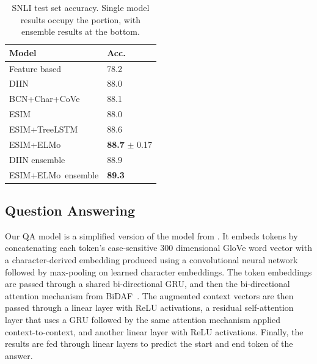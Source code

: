 \documentclass[11pt,a4paper]{article}
\newcommand{\ELMO}{ELMo}
\begin{document}
\begin{table}
\centering
\begin{tabular}{l|l}
\textbf{Model}                                                 & \textbf{Acc.} \\ \hline \hline
Feature based \citep{snliemnlp2015}                & 78.2                                                    \\
DIIN \citep{Gong2017NaturalLI}                      & 88.0                                                    \\
BCN+Char+CoVe \citep{McCann2017LearnedIT}       & 88.1                                                    \\
ESIM \citep{Chen2017EnhancedLF}                     & 88.0                                                    \\
ESIM+TreeLSTM \citep{Chen2017EnhancedLF} & 88.6                                                    \\
ESIM+\ELMO                                          & \textbf{88.7} $\pm$ 0.17                                           \\ \hline

DIIN ensemble \citep{Gong2017NaturalLI}             & 88.9                                                    \\
ESIM+\ELMO~ensemble                                 & \textbf{89.3}                                          
\end{tabular}
\caption{SNLI test set accuracy.\protect\footnotemark
Single model results occupy the portion, with ensemble results at the bottom.
}
\label{table:snli_test}
\end{table}

\subsection{Question Answering}
Our QA model is a simplified version of the model from \citet{ClarkAdvancingRC}. It embeds tokens by concatenating each token's case-sensitive 300 dimensional GloVe word vector \citep{Pennington2014GloveGV} with a character-derived embedding produced using a convolutional neural network followed by max-pooling on learned character embeddings. The token embeddings are passed through a shared bi-directional GRU, and then the bi-directional attention mechanism from BiDAF~\cite{Seo2016BidirectionalAF}. The augmented context vectors are then passed through a linear layer with ReLU activations, a residual self-attention layer that uses a GRU followed by the same attention mechanism applied context-to-context, and another linear layer with ReLU activations. Finally, the results are fed through linear layers to predict the start and end token of the answer. 
\end{document}
